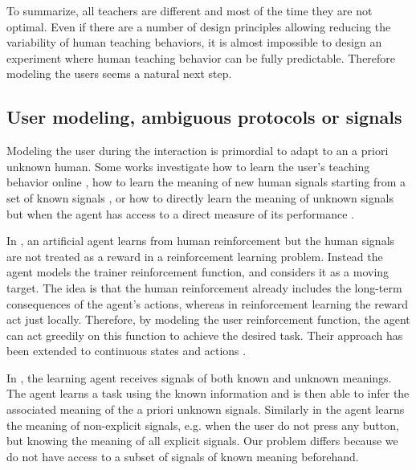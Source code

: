 \transition

To summarize, all teachers are different and most of the time they are not optimal. Even if there are a number of design principles allowing reducing the variability of human teaching behaviors, it is almost impossible to design an experiment where human teaching behavior can be fully predictable. Therefore modeling the users seems a natural next step.

\subsection{User modeling, ambiguous protocols or signals}


Modeling the user during the interaction is primordial to adapt to an a priori unknown human. Some works investigate how to learn the user's teaching behavior online \cite{knox2009interactively}, how to learn the meaning of new human signals starting from a set of known signals \cite{macl11simul,loftinlearning}, or how to directly learn the meaning of unknown signals but when the agent has access to a direct measure of its performance \cite{branavan2011learning,kim2012unsupervised,doshi2008spoken}.

In \cite{knox2009interactively}, an artificial agent learns from human reinforcement but the human signals are not treated as a reward in a reinforcement learning problem. Instead the agent models the trainer reinforcement function, and considers it as a moving target. The idea is that the human reinforcement already includes the long-term consequences of the agent's actions, whereas in reinforcement learning the reward act just locally. Therefore, by modeling the user reinforcement function, the agent can act greedily on this function to achieve the desired task. Their approach has been extended to continuous states and actions \cite{vien2013learning}.

In \cite{macl11simul}, the learning agent receives signals of both known and unknown meanings. The agent learns a task using the known information and is then able to infer the associated meaning of the a priori unknown signals. Similarly in \cite{loftinlearning} the agent learns the meaning of non-explicit signals, e.g. when the user do not press any button, but knowing the meaning of all explicit signals. Our problem differs because we do not have access to a subset of signals of known meaning beforehand.

